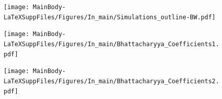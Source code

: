 \documentclass[12pt,letterpaper]{article}
\begin{document}

\setcounter{figure}{0} \renewcommand{\thefigure}{\arabic{figure}}

\newpage
\begin{figure}[!htbp]
\centering
    \texttt{[image: MainBody-LaTeXSuppFiles/Figures/In\_main/Simulations\_outline-BW.pdf]}
\caption{ }
\end{figure}

\newpage
\begin{figure}[!htbp]
\centering
    \texttt{[image: MainBody-LaTeXSuppFiles/Figures/In\_main/Bhattacharyya\_Coefficients1.pdf]}
\caption{ }
\end{figure}

\newpage
\begin{figure}[!htbp]
\centering
    \texttt{[image: MainBody-LaTeXSuppFiles/Figures/In\_main/Bhattacharyya\_Coefficients2.pdf]}
\caption{ }
\end{figure}
\end{document}
